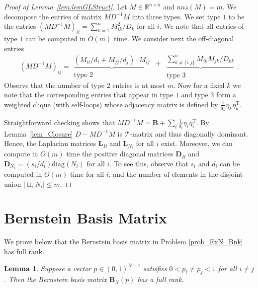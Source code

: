 \documentclass[11pt]{article}
\newcommand{\GL}{\mathcal{T}}
\newcommand{\Di}{D^{-1}}
\newcommand{\mD}{\mathbf{D}}
\newcommand{\mL}{\mathbf{L}}
\newcommand{\mB}{\mathbf{B}}
\newcommand{\diag}{\mathrm{diag}}
\newcommand{\rot}{\mathrm{T}}
\renewcommand{\leq}{\leqslant}
\newcommand{\lemref}[1]{Lemma~\ref{lem:#1}}
\newtheorem{lem}[thm]{Lemma}
\numberwithin{thm}{section}
\begin{document}
\begin{proof}[Proof of \lemref{lemGLStruct}]
Let $M\in\mathbb{R}^{n\times n}$ and $nnz(M)=m$. We decompose the entries of matrix $M\Di M$ into three types. We set type $1$ to be the entries $(M\Di M)_{ii}=\sum_{k=1}^{n}M_{ik}^{2}/D_{k}$ for all $i$. We note that all entries of type $1$ can be computed in $O(m)$ time. We consider next the off-diagonal entries
\[
(M\Di M)_{ij}=\begin{array}{c}
\underbrace{(M_{ii}/d_{i}+M_{jj}/d_{j})\cdot M_{ij}}\\
\text{type 2}
\end{array}\begin{array}{c}
+\\
\\
\end{array}\begin{array}{c}
\underbrace{\sum_{k\neq\{ i,j\} }^{n}M_{ik}M_{jk}/D_{kk}}\\
\text{type 3}
\end{array}.
\]
Observe that the number of type $2$ entries is at most $m$. Now for a fixed $k$ we note that the corresponding entries that appear in type $1$ and type $3$ form
a weighted clique (with self-loops) whose adjacency matrix is defined by $\frac{1}{d_{k}}\eta_{k}\eta_{k}^{\rot}$.


Straightforward checking shows that $M\Di M=\mB+\sum_{i}\frac{1}{d_{i}}\eta_{i}\eta_{i}^{\rot}$.
By Lemma~\ref{lem_Closure} $D-M\Di M$ is $\GL$-matrix and thus diagonally dominant. Hence, the Laplacian matrices $\mL_{B}$ and $\mL_{N_i}$ for all $i$ exist. Moreover, we can compute in $O(m)$ time the positive diagonal matrices $\mD_{B}$ and $\mD_{N_i}=(s_{i}/d_{i})\diag(N_i)$ for all $i$. To see this, observe that $s_i$ and $d_i$ can be computed in $O(m)$ time for all $i$, and the number of elements in the disjoint union $|\sqcup_{i}N_i|\leq m$.
\end{proof}


\section{Bernstein Basis Matrix}\label{appsec:BBM}

We prove below that the Bernstein basis matrix in Problem \ref{prob_ExN_Bnk} has full rank.

\begin{lem}
\label{lem_full_Rank}
Suppose a vector $p\in(0,1)^{N+1}$ satisfies
$0<p_{i}\neq p_{j}<1$ for all $i\neq j$. Then the Bernstein
basis matrix $\mB_{N}(p)$ has a full rank.
\end{lem}
\end{document}
